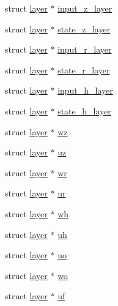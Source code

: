 \begin{DoxyCompactItemize}
\item 
struct \mbox{\hyperlink{structlayer}{layer}} $\ast$ \mbox{\hyperlink{structlayer_addf22ace8c49b848e3f19122bdb703d5}{input\+\_\+z\+\_\+layer}}
\item 
struct \mbox{\hyperlink{structlayer}{layer}} $\ast$ \mbox{\hyperlink{structlayer_a22598554a0e6c65dd6e6fb2246ceb6cf}{state\+\_\+z\+\_\+layer}}
\item 
struct \mbox{\hyperlink{structlayer}{layer}} $\ast$ \mbox{\hyperlink{structlayer_a7c67ff6cd710e56e2eb0da199c4d0cff}{input\+\_\+r\+\_\+layer}}
\item 
struct \mbox{\hyperlink{structlayer}{layer}} $\ast$ \mbox{\hyperlink{structlayer_a2ce6e1f069b4ebc57b4a49d56afbe875}{state\+\_\+r\+\_\+layer}}
\item 
struct \mbox{\hyperlink{structlayer}{layer}} $\ast$ \mbox{\hyperlink{structlayer_a526089c1cc0aa9d9738f3e5b8358166f}{input\+\_\+h\+\_\+layer}}
\item 
struct \mbox{\hyperlink{structlayer}{layer}} $\ast$ \mbox{\hyperlink{structlayer_a8d566da721348636889c3f9aadd6f5e0}{state\+\_\+h\+\_\+layer}}
\item 
struct \mbox{\hyperlink{structlayer}{layer}} $\ast$ \mbox{\hyperlink{structlayer_af5ebb2f94c441e094e4ba3f04e318185}{wz}}
\item 
struct \mbox{\hyperlink{structlayer}{layer}} $\ast$ \mbox{\hyperlink{structlayer_aebc50a1f698ed78ce6ca500609ad7308}{uz}}
\item 
struct \mbox{\hyperlink{structlayer}{layer}} $\ast$ \mbox{\hyperlink{structlayer_a9385c1d546abb2148bb8e05258d19bd4}{wr}}
\item 
struct \mbox{\hyperlink{structlayer}{layer}} $\ast$ \mbox{\hyperlink{structlayer_a9e91b6abfb4f0d901e6e62c46f8ccab9}{ur}}
\item 
struct \mbox{\hyperlink{structlayer}{layer}} $\ast$ \mbox{\hyperlink{structlayer_a2060deb333927330706e80f48129b7f0}{wh}}
\item 
struct \mbox{\hyperlink{structlayer}{layer}} $\ast$ \mbox{\hyperlink{structlayer_ae663063cf926ae0cb83b03113479ca2a}{uh}}
\item 
struct \mbox{\hyperlink{structlayer}{layer}} $\ast$ \mbox{\hyperlink{structlayer_a071f72e7d57e6612d98defa8d4f1e3e7}{uo}}
\item 
struct \mbox{\hyperlink{structlayer}{layer}} $\ast$ \mbox{\hyperlink{structlayer_a9a4ba5c783fb440ee82552fe917254b6}{wo}}
\item 
struct \mbox{\hyperlink{structlayer}{layer}} $\ast$ \mbox{\hyperlink{structlayer_a509fb446cc0040855b530840f4cc9aad}{uf}}

\end{DoxyCompactItemize}
